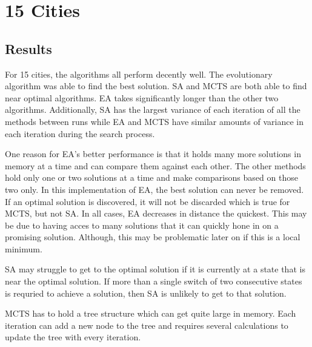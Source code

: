 \section{15 Cities}
\subsection{Results}
For 15 cities, the algorithms all perform decently well.  The evolutionary algorithm was able to find the best solution.  SA and MCTS are both able to find near optimal algorithms.  EA takes significantly longer than the other two algorithms.  Additionally, SA has the largest variance of each iteration of all the methods between runs while EA and MCTS have similar amounts of variance in each iteration during the search process.    

One reason for EA's better performance is that it holds many more solutions in memory at a time and can compare them against each other.  The other methods hold only one or two solutions at a time and make comparisons based on those two only.  In this implementation of EA, the best solution can never be removed.  If an optimal solution is discovered, it will not be discarded which is true for MCTS, but not SA.  In all cases, EA decreases in distance the quickest.  This may be due to having acces to many solutions that it can quickly hone in on a promising solution.  Although, this may be problematic later on if this is a local minimum.

SA may struggle to get to the optimal solution if it is currently at a state that is near the optimal solution.  If more than a single switch of two consecutive states is requried to achieve a solution, then SA is unlikely to get to that solution.

MCTS has to hold a tree structure which can get quite large in memory.  Each iteration can add a new node to the tree and requires several calculations to update the tree with every iteration.  

